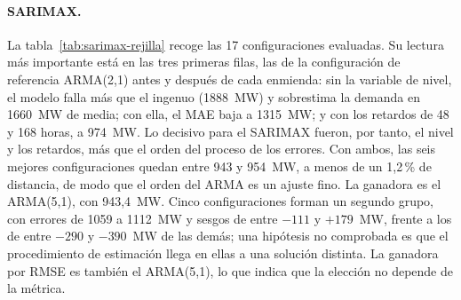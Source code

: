 \paragraph{SARIMAX.} La tabla~\ref{tab:sarimax-rejilla} recoge las 17
configuraciones evaluadas. Su lectura más importante está en las tres
primeras filas, las de la configuración de referencia ARMA(2,1) antes y
después de cada enmienda: sin la variable de nivel, el modelo falla más que el
ingenuo (1888~MW) y sobrestima la demanda en 1660~MW de media; con ella, el
MAE baja a 1315~MW; y con los retardos de 48 y 168 horas, a 974~MW. Lo
decisivo para el SARIMAX fueron, por tanto, el nivel y los retardos, más que
el orden del proceso de los errores. Con ambos, las seis mejores
configuraciones quedan entre 943 y 954~MW, a menos de un 1,2\,\% de distancia,
de modo que el orden del ARMA es un ajuste fino. La ganadora es el ARMA(5,1),
con 943,4~MW. Cinco configuraciones forman un segundo grupo, con errores de
1059 a 1112~MW y sesgos de entre $-111$ y $+179$~MW, frente a los de entre
$-290$ y $-390$~MW de las demás; una hipótesis no comprobada es que el
procedimiento de estimación llega en ellas a una solución distinta. La ganadora por RMSE es también el ARMA(5,1), lo que indica
que la elección no depende de la métrica.

